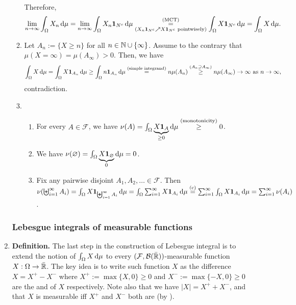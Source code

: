 \begin{enumerate}
\begin{pf}
\begin{enumerate}
Therefore,
\[
\lim_{n\to\infty}\int_{\Omega}^{}X_n\odif{\mu}
=\lim_{n\to\infty}\int_{\Omega}^{}X_n\indic_{N^c}\odif{\mu}
\underset{(X_n\indic_{N^c}\nearrow X\indic_{N^c}\text{ pointwisely})}{\overset{\text{(MCT)}}{=}}
\int_{\Omega}^{}X\indic_{N^c}\odif{\mu}
=\int_{\Omega}^{}X\odif{\mu}.
\]
\item Let \(A_n:=\{X\ge n\}\) for all \(n\in\mathbb{N}\cup\{\infty\}\). Assume to the
contrary that \(\mu(X=\infty)=\mu(A_{\infty})>0\). Then, we have
\[
\int_{\Omega}^{}X\odif{\mu}=\int_{\Omega}^{}X\indic_{A_n}\odif{\mu}
\ge\int_{\Omega}^{}n\indic_{A_n}\odif{\mu}
\overset{\text{(simple integrand)}}{=}
n\mu(A_n)\overset{(A_n\supseteq A_{\infty})}{\ge}
n\mu(A_{\infty})\to\infty\text{ as \(n\to\infty\),}
\]
contradiction.
\item \begin{enumerate}[label={(\arabic*)}]
\item For every \(A\in\mathcal{F}\), we have
\(\nu(A)=\int_{\Omega}^{}\underbrace{X\indic_{A}}_{\ge
0}\odif{\mu}\overset{\text{(monotonicity)}}{\ge} 0\).
\item We have \(\nu(\varnothing)=\int_{\Omega}^{}\underbrace{X\indic_{\varnothing}}_{0}\odif{\mu}
=0\).
\item Fix any pairwise disjoint \(A_1,A_2,\dotsc\in\mathcal{F}\). Then
\(\nu(\biguplus_{i=1}^{\infty}A_i)
=\int_{\Omega}^{}X\indic_{\biguplus_{i=1}^{\infty}A_i}\odif{\mu}
=\int_{\Omega}^{}\sum_{i=1}^{\infty}X\indic_{A_i}\odif{\mu}
\overset{\text{(c)}}{=}\sum_{i=1}^{\infty}\int_{\Omega}^{}X\indic_{A_i}\odif{\mu}
=\sum_{i=1}^{\infty}\nu(A_i)\).
\end{enumerate}
\end{enumerate}
\end{pf}
\subsubsection*{Lebesgue integrals of measurable functions}
\item \textbf{Definition.} The last step in the construction of Lebesgue
integral is to extend the notion of \(\int_{\Omega}^{}X\odif{\mu}\) to every
\((\mathcal{F},\mathcal{B}(\bar{\mathbb{R}}))\)-measurable function
\(X:\Omega\to\bar{\mathbb{R}}\). The key idea is to write such function \(X\) as the
difference \(X=X^{+}-X^{-}\) where \(X^{+}:=\max\{X,0\}\ge 0\) and
\(X^{-}:=\max\{-X,0\}\ge 0\) are the  and  of \(X\) respectively. Note also that we have \(|X|=X^{+}+X^{-}\), and
that \(X\) is measurable iff \(X^{+}\) and \(X^{-}\) both are (by
).



\end{enumerate}
